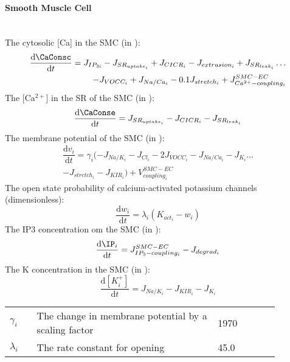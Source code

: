 \paragraph{Smooth Muscle Cell}~\\
%
The cytosolic [\gls{Ca}] in the \gls{SMC} (in \uM):
\begin{equation}\label{eq:ci}
\begin{split}
\dfrac{\mathrm{d}\CaConsc}{\mathrm{d}t} = J_{IP_{3i}} - J_{SR_{uptake_{i}}} + J_{CICR_{i}} - J_{extrusion_{i}} +  J_{SR_{leak_{i}}}\dots \\
 - J_{VOCC_{i}} + J_{Na/Ca_{i}}  - 0.1J_{stretch_{i}} + J_{Ca^{2+}-coupling_{i}}^{SMC-EC}
\end{split} 
\end{equation}
%
The [Ca$^{2+}$] in the \gls{SR} of the \gls{SMC} (in \uM):
\begin{equation} \label{eq:si}
\dfrac{\mathrm{d}\CaConse}{\mathrm{d}t} =  J_{SR_{uptake_{i}}} - J_{CICR_{i}} - J_{SR_{leak_{i}}}
\end{equation}
%
The membrane potential of the \gls{SMC} (in \mV):
\begin{equation} \label{eq:vi}
\begin{split}
\dfrac{\mathrm{d}v_{i}}{\mathrm{d}t} = \gamma_{i}( -J_{Na/K_{i}} - J_{Cl_{i}} - 2J_{VOCC_{i}}- J_{Na/Ca_{i}} - J_{K_{i}} \dots \\
- J_{stretch_{i}} - J_{KIR_{i}} ) +V^{SMC-EC}_{coupling_{i}}
\end{split}
\end{equation}
%
The open state probability of calcium-activated potassium channels (dimensionless):
\begin{equation} \label{eq:dwidt}
\dfrac{\mathrm{d}w_{i}}{\mathrm{d}t} =  \lambda_{i} \left( K_{act_{i}} - w_{i} \right)
\end{equation}
%
The \gls{IP3} concentration om the \gls{SMC} (in \uM):
\begin{equation} \label{eq:dIidt}
\dfrac{\mathrm{d}\IP _{i}}{\mathrm{d}t} = J^{SMC-EC}_{IP_{3}-coupling_{i}} - J_{degrad_{i}}
\end{equation}
%
The \gls{K} concentration in the \gls{SMC} (in \uM):
\begin{equation} \label{eq:dkidt}
\dfrac{\mathrm{d} [K^+_{i}]}{\mathrm{d}t}  = J_{Na/K_{i}}  - J_{KIR_{i}} - J_{K_{i}}
\end{equation}

\begin{table}[h!]
\centering
\begin{tabular}{| p{0.09\linewidth} | >{\footnotesize} p{0.6\linewidth} | >{\footnotesize} p{0.17\linewidth} | >{\footnotesize} p{0.02\linewidth} |}
\arrayrulecolor{lightgrey}\hline
$\gamma_{i}$				& The change in membrane potential by a scaling factor					& 1970 \mVpuM	& \cite{Koenigsberger2006} \\
$\lambda_{i} $				& The rate constant for opening											& 45.0 \pers 	& \cite{Koenigsberger2006} \\
\hline
\end{tabular}
\label{tab:dcidt}
\end{table}

